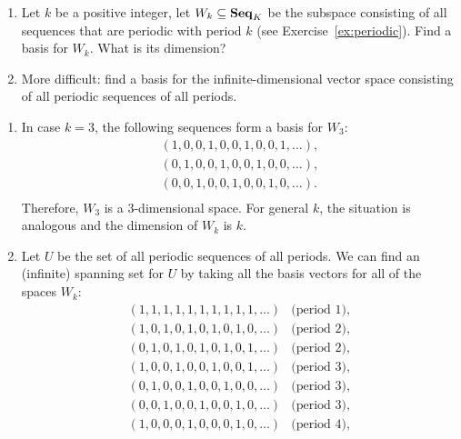 \begin{ex}
  \begin{enumerate}
  \item Let $k$ be a positive integer, let $W_k\subseteq\mathbf{Seq}_K$ be the
    subspace consisting of all sequences that are periodic%
     with period $k$ (see
    Exercise~\ref{ex:periodic}). Find a basis for $W_k$. What is its
    dimension?
  \item More difficult: find a basis for the infinite-dimensional
    vector space consisting of all periodic sequences of all periods.
  \end{enumerate}
  \begin{sol}
    \begin{enumerate}
    \item In case $k=3$, the following sequences form a basis for
      $W_3$:
      \begin{equation*}
        \begin{array}{l}
          (1,0,0,1,0,0,1,0,0,1,\ldots), \\
          (0,1,0,0,1,0,0,1,0,0,\ldots), \\
          (0,0,1,0,0,1,0,0,1,0,\ldots). \\
        \end{array}
      \end{equation*}
      Therefore, $W_3$ is a 3-dimensional space. For general $k$,
      the situation is analogous and the dimension of $W_k$ is $k$.
    \item Let $U$ be the set of all periodic sequences of all
      periods. We can find an (infinite) spanning set for $U$ by
      taking all the basis vectors for all of the spaces $W_k$:
      \begin{equation*}
        \begin{array}{ll}
          (1,1,1,1,1,1,1,1,1,1,\ldots) & \mbox{(period $1$)},\\[1ex]
          (1,0,1,0,1,0,1,0,1,0,\ldots) & \mbox{(period $2$)}, \\
          (0,1,0,1,0,1,0,1,0,1,\ldots) & \mbox{(period $2$)},\\[1ex]
          (1,0,0,1,0,0,1,0,0,1,\ldots) & \mbox{(period $3$)}, \\
          (0,1,0,0,1,0,0,1,0,0,\ldots) & \mbox{(period $3$)}, \\
          (0,0,1,0,0,1,0,0,1,0,\ldots) & \mbox{(period $3$)},\\[1ex]
          (1,0,0,0,1,0,0,0,1,0,\ldots) & \mbox{(period $4$)}, \\

\end{array}
\end{equation*}
\end{enumerate}
\end{sol}
\end{ex}
